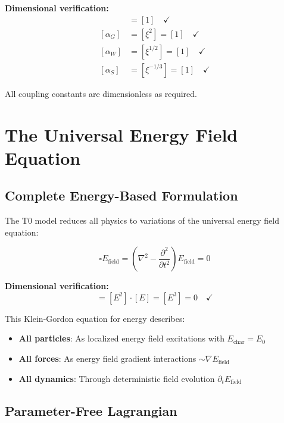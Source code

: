 \documentclass[12pt,a4paper]{report}
\begin{document}
\textbf{Dimensional verification:}
\begin{align}
	[\alpha_{EM}] &= [1] \quad \checkmark \\
	[\alpha_G] &= [\xi^2] = [1] \quad \checkmark \\
	[\alpha_W] &= [\xi^{1/2}] = [1] \quad \checkmark \\
	[\alpha_S] &= [\xi^{-1/3}] = [1] \quad \checkmark
\end{align}

All coupling constants are dimensionless as required.

\section{The Universal Energy Field Equation}
\label{sec:universal_energy_field_equation}

\subsection{Complete Energy-Based Formulation}
\label{subsec:complete_energy_formulation}

The T0 model reduces all physics to variations of the universal energy field equation:

\begin{equation}
	\boxed{\square E_{\text{field}} = \left(\nabla^2 - \frac{\partial^2}{\partial t^2}\right) E_{\text{field}} = 0}
	\label{eq:universal_field_equation}
\end{equation}

\textbf{Dimensional verification:}
\begin{equation}
	[\square E_{\text{field}}] = [E^2] \cdot [E] = [E^3] = 0 \quad \checkmark
\end{equation}

This Klein-Gordon equation for energy describes:
\begin{itemize}
	\item \textbf{All particles}: As localized energy field excitations with $E_{\text{char}} = E_0$
	\item \textbf{All forces}: As energy field gradient interactions $\sim \nabla E_{\text{field}}$
	\item \textbf{All dynamics}: Through deterministic field evolution $\partial_t E_{\text{field}}$
\end{itemize}

\subsection{Parameter-Free Lagrangian}
\label{subsec:parameter_free_lagrangian}
\end{document}
